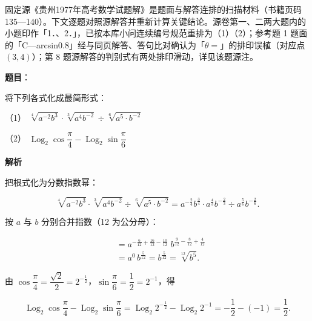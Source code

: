 

\begin{gktip}
固定源《贵州1977年高考数学试题解》是题面与解答连排的扫描材料（书籍页码 135—140）。下文逐题对照源解答并重新计算关键结论。源卷第一、二两大题内的小题印作「1．、2．」，已按本库小问连续编号规范重排为（1）（2）；参考题 1 题面的「C—arcsin0.8」经与同页解答、答句比对确认为「$\theta=$」的排印误植（对应点 $(3,4)$）；第 8 题源解答的判别式有两处排印滑动，详见该题源注。
\end{gktip}

\begin{answer}

\textbf{题目}：

将下列各式化成最简形式：

（1） $\sqrt[4]{a^{-2}b^{3}}\cdot\sqrt[3]{a^{4}b^{-2}}\div\sqrt[6]{a^{5}\cdot b^{-2}}$

（2） $\operatorname{Log}_2\cos\dfrac{\pi}{4}-\operatorname{Log}_2\sin\dfrac{\pi}{6}$

\textbf{解析}


把根式化为分数指数幂：

\nopagebreak[4]
\[
\sqrt[4]{a^{-2}b^{3}}\cdot\sqrt[3]{a^{4}b^{-2}}\div\sqrt[6]{a^{5}\cdot b^{-2}}
=a^{-\frac{2}{4}}b^{\frac{3}{4}}\cdot a^{\frac{4}{3}}b^{-\frac{2}{3}}\div a^{\frac{5}{6}}b^{-\frac{2}{6}}.
\]

按 $a$ 与 $b$ 分别合并指数（12 为公分母）：

\nopagebreak[4]
\[
\begin{aligned}
&=a^{-\frac{6}{12}+\frac{16}{12}-\frac{10}{12}}\;b^{\frac{9}{12}-\frac{8}{12}+\frac{4}{12}}\\
&=a^{0}\,b^{\frac{5}{12}}
=b^{\frac{5}{12}}
=\sqrt[12]{b^{5}}.
\end{aligned}
\]


由 $\cos\dfrac{\pi}{4}=\dfrac{\sqrt{2}}{2}=2^{-\frac{1}{2}}$，$\sin\dfrac{\pi}{6}=\dfrac{1}{2}=2^{-1}$，得

\nopagebreak[4]
\[
\operatorname{Log}_2\cos\frac{\pi}{4}-\operatorname{Log}_2\sin\frac{\pi}{6}
=\operatorname{Log}_2 2^{-\frac{1}{2}}-\operatorname{Log}_2 2^{-1}
=-\frac{1}{2}-(-1)=\frac{1}{2}.
\]



\end{answer}
